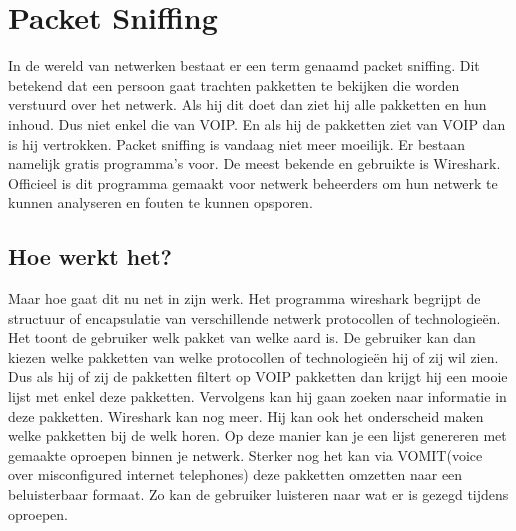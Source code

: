 \documentclass[pdftex,a4paper,12pt,twoside]{report}
\begin{document}
\section{Packet Sniffing}

In de wereld van netwerken bestaat er een term genaamd packet sniffing. Dit betekend dat een persoon gaat trachten pakketten te bekijken die worden verstuurd over het netwerk. Als hij dit doet dan ziet hij alle pakketten en hun inhoud. Dus niet enkel die van VOIP. En als hij de pakketten ziet van VOIP dan is hij vertrokken. Packet sniffing is vandaag niet meer moeilijk. Er bestaan namelijk gratis programma’s voor. De meest bekende en gebruikte is Wireshark. Officieel is dit programma gemaakt voor netwerk beheerders om hun netwerk te kunnen analyseren en fouten te kunnen opsporen.  
\subsection{Hoe werkt het?}
Maar hoe gaat dit nu net in zijn werk. Het programma wireshark begrijpt de structuur of encapsulatie van verschillende netwerk protocollen of technologieën. Het toont de gebruiker welk pakket van welke aard is. De gebruiker kan dan kiezen welke pakketten van welke protocollen of technologieën hij of zij wil zien. Dus als hij of zij de pakketten filtert op VOIP pakketten dan krijgt hij een mooie lijst met enkel deze pakketten. Vervolgens kan hij gaan zoeken naar informatie in deze pakketten. Wireshark kan nog meer. Hij kan ook het onderscheid maken welke pakketten bij de welk horen. Op deze manier kan je een lijst genereren met gemaakte oproepen binnen je netwerk. Sterker nog het kan via VOMIT(voice over misconfigured internet telephones) deze pakketten omzetten naar een beluisterbaar formaat. Zo kan de gebruiker luisteren naar wat er is gezegd tijdens oproepen.

\newpage
\end{document}
